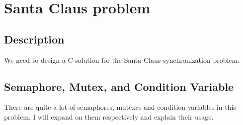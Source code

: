 \section{Santa Claus problem}
\subsection{Description}
We need to design a C solution for the Santa Claus synchronization problem.

\subsection{Semaphore, Mutex, and Condition Variable}
There are quite a lot of semaphores, mutexes and condition variables in this problem. I will expand 
on them respectively and explain their usage.

